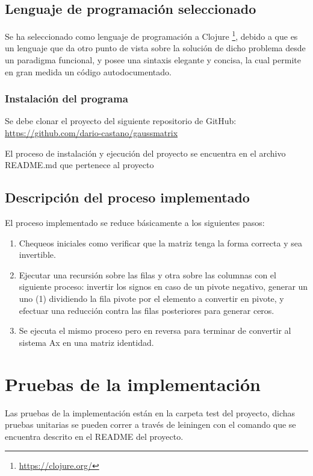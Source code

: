 \documentclass[stu, 12pt, letterpaper, donotrepeattitle, floatsintext, natbib]{apa7}
\begin{document}
\subsection{Lenguaje de programación seleccionado}
Se ha seleccionado como lenguaje de programación a Clojure \footnote{\url{https://clojure.org/}}, debido a que es un lenguaje que da otro punto de vista sobre la solución de dicho problema desde un paradigma funcional, y posee una sintaxis elegante y concisa, la cual permite en gran medida un código autodocumentado. 

\subsubsection{Instalación del programa}
Se debe clonar el proyecto del siguiente repositorio de GitHub: \url{https://github.com/dario-castano/gaussmatrix}

El proceso de instalación y ejecución del proyecto se encuentra en el archivo README.md que pertenece al proyecto
\subsection{Descripción del proceso implementado}
El proceso implementado se reduce básicamente a los siguientes pasos:

\begin{enumerate}
\item Chequeos iniciales como verificar que la matriz tenga la forma correcta y sea invertible.
\item  Ejecutar una recursión sobre las filas y otra sobre las columnas con el siguiente proceso: invertir los signos en caso de un pivote negativo, generar un uno (1) dividiendo la fila pivote por el elemento a convertir en pivote, y efectuar una reducción contra las filas posteriores para generar ceros.
\item  Se ejecuta el mismo proceso pero en reversa para terminar de convertir al sistema Ax en una matriz identidad.
\end{enumerate}



\section{\large Pruebas de la implementación}
Las pruebas  de la implementación están en la carpeta test del proyecto, dichas pruebas unitarias se pueden correr a través de leiningen con el comando que se encuentra descrito en el README del proyecto. 
\end{document}
